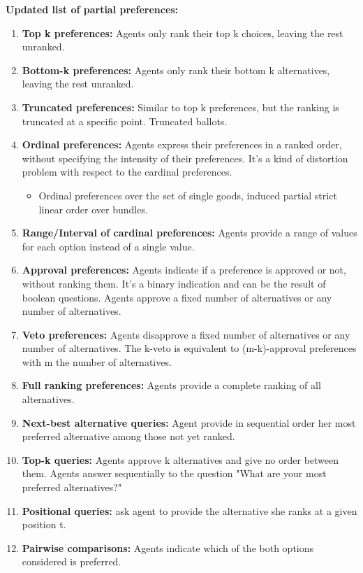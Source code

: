 \documentclass{article}
\begin{document}
\textbf{Updated list of partial preferences:}
\begin{enumerate}
    \item \textbf{Top k preferences:} Agents only rank their top k choices, leaving the rest unranked.
    \item \textbf{Bottom-k preferences:} Agents only rank their bottom k alternatives, leaving the rest unranked.
    \item \textbf{Truncated preferences:} Similar to top k preferences, but the ranking is truncated at a specific point. Truncated ballots.
    \item \textbf{Ordinal preferences:} Agents express their preferences in a ranked order, without specifying the intensity of their preferences. It's a kind of distortion problem with respect to the cardinal preferences.
    \begin{itemize}
        \item Ordinal preferences over the set of single goods, induced partial strict linear order over bundles.
    \end{itemize}
    \item \textbf{Range/Interval of cardinal preferences:} Agents provide a range of values for each option instead of a single value.
    \item \textbf{Approval preferences:} Agents indicate if a preference is approved or not, without ranking them. It's a binary indication and can be the result of boolean questions. Agents approve a fixed number of alternatives or any number of alternatives.
    \item \textbf{Veto preferences:} Agents disapprove a fixed number of alternatives or any number of alternatives. The k-veto is equivalent to (m-k)-approval preferences with m the number of alternatives.
    \item \textbf{Full ranking preferences:} Agents provide a complete ranking of all alternatives.
    \item \textbf{Next-best alternative queries:} Agent provide in sequential order her most preferred alternative among those not yet ranked.
    \item \textbf{Top-k queries:} Agents approve k alternatives and give no order between them. Agents answer sequentially to the question "What are your most preferred alternatives?"
    \item \textbf{Positional queries:} ask agent to provide the alternative she ranks at a given position t.
    \item \textbf{Pairwise comparisons:} Agents indicate which of the both options considered is preferred.

\end{enumerate}
\end{document}
